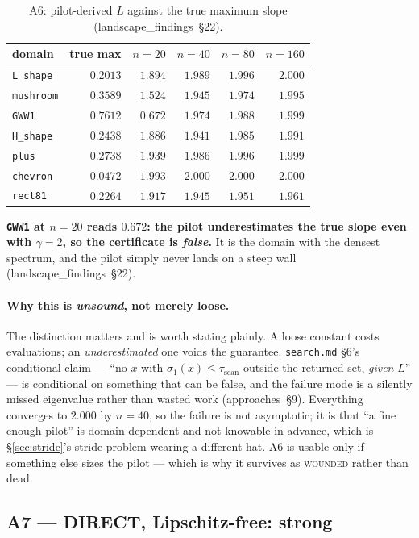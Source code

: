 \documentclass[11pt]{article}
\newcommand{\file}[1]{\texttt{#1}}
\newcommand{\lf}[1]{(landscape\_findings~\S#1)}
\newcommand{\ap}[1]{(approaches~\S#1)}
\newcommand{\sig}{\sigma}
\newcommand{\sione}{\sig_1}
\begin{document}
\begin{table}[htbp]
\centering
\caption{A6: pilot-derived $L$ against the true maximum slope \lf{22}.}
\label{tab:a6}
\begin{tabular}{lrrrrr}
\toprule
domain & true max & $n=20$ & $n=40$ & $n=80$ & $n=160$ \\
\midrule
\file{L\_shape} & $0.2013$ & $1.894$ & $1.989$ & $1.996$ & $2.000$ \\
\file{mushroom} & $0.3589$ & $1.524$ & $1.945$ & $1.974$ & $1.995$ \\
\file{GWW1}     & $0.7612$ & $\mathbf{0.672}$ & $1.974$ & $1.988$ & $1.999$ \\
\file{H\_shape} & $0.2438$ & $1.886$ & $1.941$ & $1.985$ & $1.991$ \\
\file{plus}     & $0.2738$ & $1.939$ & $1.986$ & $1.996$ & $1.999$ \\
\file{chevron}  & $0.0472$ & $1.993$ & $2.000$ & $2.000$ & $2.000$ \\
\file{rect81}   & $0.2264$ & $1.917$ & $1.945$ & $1.951$ & $1.961$ \\
\bottomrule
\end{tabular}
\end{table}

\textbf{\file{GWW1} at $n = 20$ reads $0.672$: the pilot underestimates the true slope even with
$\gamma = 2$, so the certificate is \emph{false}.} It is the domain with the densest spectrum, and
the pilot simply never lands on a steep wall \lf{22}.

\paragraph{Why this is \emph{unsound}, not merely loose.} The distinction matters and is worth
stating plainly. A loose constant costs evaluations; an \emph{underestimated} one voids the
guarantee. \file{search.md} \S6's conditional claim --- ``no $x$ with
$\sione(x) \le \tau_{\mathrm{scan}}$ outside the returned set, \emph{given} $L$'' --- is
conditional on something that can be false, and the failure mode is a silently missed eigenvalue
rather than wasted work \ap{9}. Everything converges to $2.000$ by $n = 40$, so the failure is not
asymptotic; it is that ``a fine enough pilot'' is domain-dependent and not knowable in advance,
which is \S\ref{sec:stride}'s stride problem wearing a different hat. A6 is usable only if
something else sizes the pilot --- which is why it survives as \textsc{wounded} rather than dead.

\subsection{A7 --- DIRECT, Lipschitz-free: strong}
\end{document}
